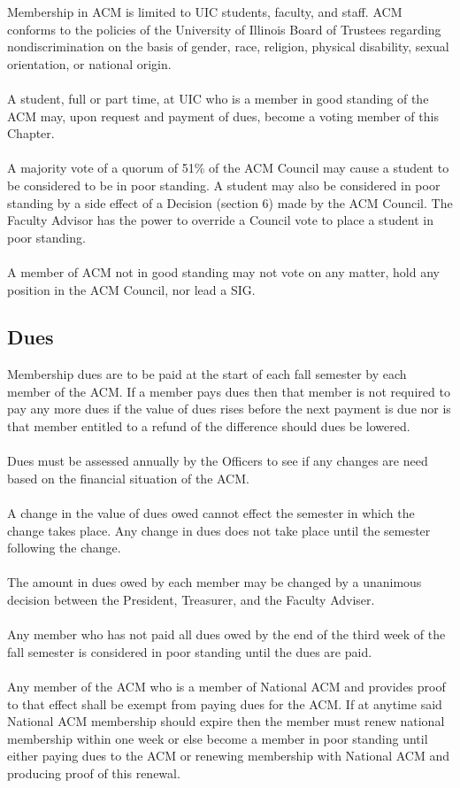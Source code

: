 \documentclass[12pt,titlepage]{article}
\begin{document}
Membership in ACM is limited to UIC students, faculty, and staff. ACM conforms to the policies of the University of Illinois Board of Trustees regarding nondiscrimination on the basis of gender, race, religion, physical disability, sexual orientation, or national origin.\\
\\
A student, full or part time, at UIC who is a member in good standing of the ACM may, upon request and payment of dues, become a voting member of this Chapter.\\
\\
A majority vote of a quorum of 51\% of the ACM Council may cause a student to be considered to be in poor standing. A student may also be considered in poor standing by a side effect of a Decision (section 6) made by the ACM Council. The Faculty Advisor has the power to override a Council vote to place a student in poor standing.\\
\\
A member of ACM not in good standing may not vote on any matter, hold any position in the ACM Council, nor lead a SIG.

\subsection{Dues}

Membership dues are to be paid at the start of each fall semester by each member of the ACM. If a member pays dues then that member is not required to pay any more dues if the value of dues rises before the next payment is due nor is that member entitled to a refund of the difference should dues be lowered.\\
\\
Dues must be assessed annually by the Officers to see if any changes are need based on the financial situation of the ACM.\\
\\
A change in the value of dues owed cannot effect the semester in which the change takes place. Any change in dues does not take place until the semester following the change.\\
\\
The amount in dues owed by each member may be changed by a unanimous decision between the President, Treasurer, and the Faculty Adviser.\\
\\
Any member who has not paid all dues owed by the end of the third week of the fall semester is considered in poor standing until the dues are paid.\\
\\
Any member of the ACM who is a member of National ACM and provides proof to that effect shall be exempt from paying dues for the ACM. If at anytime said National ACM membership should expire then the member must renew national membership within one week or else become a member in poor standing until either paying dues to the ACM or renewing membership with National ACM and producing proof of this renewal.
\end{document}
